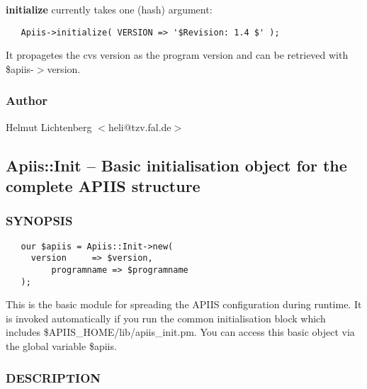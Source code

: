 \textbf{initialize} currently takes one (hash) argument:

\begin{verbatim}
   Apiis->initialize( VERSION => '$Revision: 1.4 $' );
\end{verbatim}


It propagetes the cvs version as the program version and can be retrieved
with \$apiis-$>$version.

\subsubsection*{Author\label{Apiis_pm_Author}}


Helmut Lichtenberg $<$heli@tzv.fal.de$>$

\subsection{Apiis::Init -- Basic initialisation object for the complete APIIS structure\label{Apiis::Init_--_Basic_initialisation_object_for_the_complete_APIIS_structure}}




\subsubsection*{SYNOPSIS\label{Apiis::Init_--_Basic_initialisation_object_for_the_complete_APIIS_structure_SYNOPSIS}}
\begin{verbatim}
   our $apiis = Apiis::Init->new(
     version     => $version,
         programname => $programname
   );
\end{verbatim}


This is the basic module for spreading the APIIS configuration during
runtime.  It is invoked automatically if you run the common
initialisation block which includes \$APIIS\_HOME/lib/apiis\_init.pm. You
can access this basic object via the global variable \$apiis.

\subsubsection*{DESCRIPTION\label{Apiis::Init_--_Basic_initialisation_object_for_the_complete_APIIS_structure_DESCRIPTION}}


